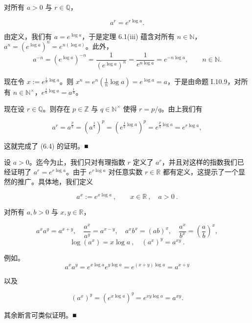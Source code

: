 \begin{proposition}

对所有 $ a > 0 $ 与 $ r \in \mathbb{Q} $，

\begin{equation}
a^{r}=e^{r\log a}.
\end{equation}

\proofhead
由定义，我们有 $ a = e^{\log a} $，于是定理 6.1(iii) 蕴含对所有 $ n \in \mathbb{N} $，$ a^n = (e^{\log a})^n = e^{n(\log a)} $。此外，
\[
a^{-n}=(e^{\log a})^{-n}=\frac{1}{(e^{\log a})^{n}}=\frac{1}{e^{n\log a}}=e^{-n\log a},\qquad n\in\mathbb{N}.
\]

现在令 $x := e^{\frac{1}{n} \log a}$。则 $x^n = e^n(\frac{1}{n} \log a) = e^{\log a} = a$，于是由命题 I.10.9，对所有 $n \in \mathbb{N}^\times$，$e^{\frac{1}{n} \log a} = a^{\frac{1}{n}}$。

现在设 $ r \in \mathbb{Q} $。则存在 $ p \in \mathbb{Z} $ 与 $ q \in \mathbb{N}^\times $ 使得 $ r = p/q $。由上我们有

\[
a^{r}=a^{\frac{p}{q}}=\left(a^{\frac{1}{q}}\right)^{p}=\left(e^{\frac{1}{q}\log a}\right)^{p}=e^{\frac{p}{q}\log a}=e^{r\log a},
\]

这就完成了 (6.4) 的证明。■

\end{proposition}


设 $a > 0$。迄今为止，我们只对有理指数 $r$ 定义了 $a^r$，并且对这样的指数我们已经证明了 $a^r = e^{r \log a}$。由于 $e^{r \log a}$ 对任意实数 $r \in \mathbb{R}$ 都有定义，这提示了一个显然的推广。具体地，我们定义

\[
a^{x}:=e^{x\log a}~,\qquad x\in\mathbb{R}~,\quad a>0~.
\]

\begin{proposition}

对所有 $ a, b > 0 $ 与 $ x, y \in \mathbb{R} $，

\[
a^{x}a^{y}=a^{x+y},\quad\frac{a^{x}}{a^{y}}=a^{x-y},\quad a^{x}b^{x}=(ab)^{x},\quad\frac{a^{x}}{b^{x}}=\left(\frac{a}{b}\right)^{x},
\]
\[
\log(a^{x})=x\log a~,\quad(a^{x})^{y}=a^{xy}~.
\]

\proofhead
例如。
\[
a^{x}a^{y}=e^{x\log a}e^{y\log a}=e^{(x+y)\log a}=a^{x+y}
\]

以及

\[
(a^{x})^{y}=(e^{x\log a})^{y}=e^{xy\log a}=a^{xy}.
\]

其余断言可类似证明。■

\end{proposition}

